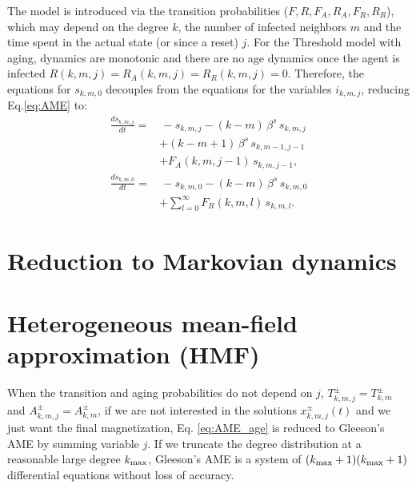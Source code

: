     The model is introduced via the transition probabilities ($F, R, F_A, R_A, F_R, R_R$), which may depend on the degree $k$, the number of infected neighbors $m$ and the time spent in the actual state (or since a reset) $j$. For the Threshold model with aging, dynamics are monotonic and there are no age dynamics once the agent is infected $R (k,m,j) = R_A (k,m,j) = R_R(k,m,j) = 0$. Therefore, the equations for $s_{k,m,0}$  decouples from the equations for the variables $i_{k,m,j}$, reducing Eq.\eqref{eq:AME} to:
    \begin{align}
    \label{eq:AME_Threshold_AP}
        \frac{d s_{k,m,j}}{dt}  = & \, - s_{k,m,j} - (k - m)\, \beta^s \,   s_{k,m,j} \nonumber\\
        & + (k-m+1) \, \beta^s \,  s_{k,m-1,j-1}  \nonumber\\
        & + F_{A} (k,m,j-1)\,  s_{k,m,j-1},  \\
        \frac{d s_{k,m,0}}{dt}  = & \,  - s_{k,m,0} - (k - m)\, \beta^s \,  s_{k,m,0} \nonumber \\
        & + \sum_{l = 0}^{\infty} F_{R}(k,m,l) \, s_{k,m,l} . \nonumber
    \end{align}

    \section{\label{sec:Reduction to Markovian dynamics}  Reduction to Markovian dynamics}

    \section{\label{sec:Heterogeneous mean-field approximation}  Heterogeneous mean-field approximation (HMF)}

    When the transition and aging probabilities do not depend on $j$, $T^{\pm}_{k,m,j} = T^{\pm}_{k,m}$ and $A^{\pm}_{k,m,j} = A^{\pm}_{k,m}$, if we are not interested in the solutions $x^{\pm}_{k,m,j} (t)$ and we just want the final magnetization, Eq. \ref{eq:AME_age} is reduced to Gleeson's AME \cite{gleeson-2013} by summing variable $j$. If we truncate the degree distribution at a reasonable large degree $k_{\rm max}$, Gleeson's AME is a system of $(k_{\rm max}+1)(k_{\rm max}+1)$ differential equations without loss of accuracy.

